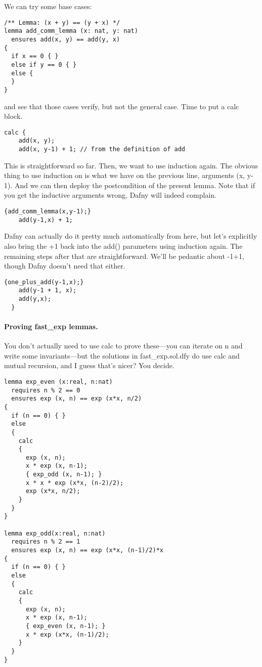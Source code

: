 \documentclass[11pt]{article}
\begin{document}
We can try some base cases:
\begin{lstlisting}[language=dafny]
/** Lemma: (x + y) == (y + x) */
lemma add_comm_lemma (x: nat, y: nat)
  ensures add(x, y) == add(y, x)
{
  if x == 0 { }
  else if y == 0 { }
  else {
  }
}
\end{lstlisting}
and see that those cases verify, but not the general case. Time to put a \textsf{calc} block.
\begin{lstlisting}[language=dafny]
  calc {
    add(x, y);
    add(x, y-1) + 1; // from the definition of add
\end{lstlisting}
This is straightforward so far. Then, we want to use induction again. The obvious thing to use
induction on is what we have on the previous line, arguments \textsf{(x, y-1)}. And we can then
deploy the postcondition of the present lemma. Note that if you get the inductive arguments
wrong, Dafny will indeed complain.
\begin{lstlisting}[language=dafny]
    {add_comm_lemma(x,y-1);}
    add(y-1,x) + 1;
\end{lstlisting}
Dafny can actually do it pretty much automatically from here, but let's explicitly also bring the
\textsf{+1} back into the \textsf{add()} parameters using induction again. The remaining steps
after that are straightforward. We'll be pedantic about \textsf{-1+1}, though Dafny doesn't need that either.
\begin{lstlisting}[language=dafny]
    {one_plus_add(y-1,x);}
    add(y-1 + 1, x);
    add(y,x);
  }
\end{lstlisting}

\paragraph{Proving \textsf{fast\_exp} lemmas.} You don't actually need to use \textsf{calc} to prove these---you can iterate on \textsf{n} and write some invariants---but the solutions in \textsf{fast\_exp.sol.dfy} do use
\textsf{calc} and mutual recursion, and I guess that's nicer? You decide.

\begin{lstlisting}[language=dafny]
lemma exp_even (x:real, n:nat)
  requires n % 2 == 0
  ensures exp (x, n) == exp (x*x, n/2)
{
  if (n == 0) { }
  else
  {
    calc
    {
      exp (x, n);
      x * exp (x, n-1);
      { exp_odd (x, n-1); }
      x * x * exp (x*x, (n-2)/2);
      exp (x*x, n/2);
    }
  }
}

lemma exp_odd(x:real, n:nat)
  requires n % 2 == 1
  ensures exp (x, n) == exp (x*x, (n-1)/2)*x
{
  if (n == 0) { }
  else
  {
    calc
    {
      exp (x, n);
      x * exp (x, n-1);
      { exp_even (x, n-1); }
      x * exp (x*x, (n-1)/2);
    }
  }
}
\end{lstlisting}
\end{document}

